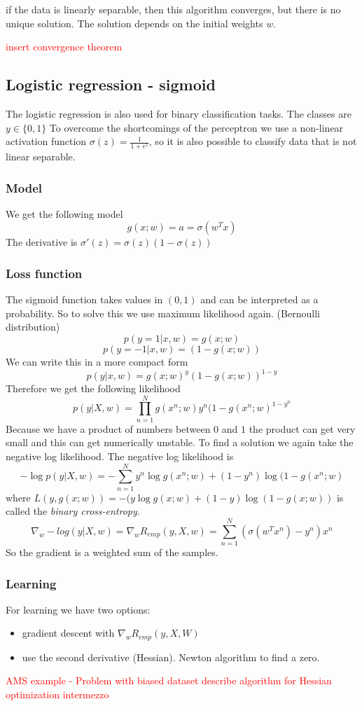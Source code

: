 \documentclass[10pt,a4paper]{article}
\begin{document}
if the data is linearly separable, then this algorithm converges, but there is no unique solution. The solution depends on the initial weights $w$.

\textcolor{red}{insert convergence theorem}

\subsection{Logistic regression - sigmoid}
The logistic regression is also used for binary classification tasks.  The classes are $y \in \{0,1\}$
To overcome the shortcomings of the perceptron we use a non-linear activation function $\sigma(z) = \frac{1}{1 + e^z}$, so it is also possible to classify data that is not linear separable.

\subsubsection{Model}
We get the following model 
\[  g(x;w) = a = \sigma(w^Tx)\]
The derivative is $\sigma'(z)=\sigma(z)(1-\sigma(z))$

\subsubsection{Loss function}
The sigmoid function takes values in $(0,1)$ and can be interpreted as a probability. So to solve this we use maximum likelihood again. (Bernoulli distribution)
\[ p(y = 1 | x, w) = g(x;w)\]
\[ p(y = -1 | x, w) = (1 - g(x;w))\]
We can write this in a more compact form
\[ p(y | x, w) = g(x;w)^y(1-g(x;w))^{1-y}\]
Therefore we get the following likelihood
\[ p(y | X, w) = \prod_{n=1}^N g(x^n;w)y^n(1 - g(x^n;w)^{1-y^n}\]
Because we have a product of numbers between $0$ and $1$ the product can get very small and this can get numerically unstable. 
To find a solution we again take the negative log likelihood. 
The negative log likelihood is 
\[ -\log p(y | X, w) = - \sum_{n=1}^N y^n \log g(x^n;w) + (1-y^n)\log(1 - g(x^n;w)\]
where $ L(y,g(x;w)) = -(y \log g(x;w) + (1-y)\log(1 - g(x;w))$ is called the \textit{binary cross-entropy}.
\[ \nabla_w - log(y | X,w) = \nabla_w R_{emp}(y, X, w) = \sum_{n=1}^N (\sigma(w^Tx^n)-y^n)x^n\]
So the gradient is a weighted sum of the samples. 
\subsubsection{Learning}
For learning we have two options:
\begin{itemize}
\item gradient descent with $\nabla_w R_{emp}(y, X, W)$
\item use the second derivative (Hessian). Newton algorithm to find a zero.
\end{itemize}
\textcolor{red}{AMS example - Problem with biased dataset}
\textcolor{red}{describe algorithm for Hessian} \textcolor{red}{optimization intermezzo}
\end{document}
